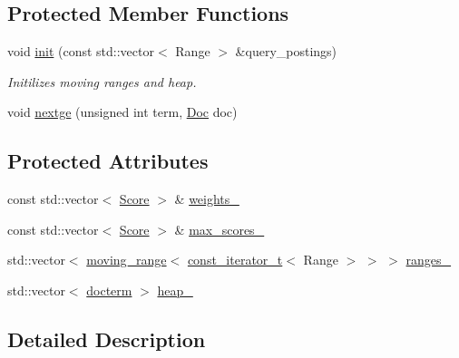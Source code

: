 \subsection*{Protected Member Functions}
\begin{DoxyCompactItemize}
\item 
void \mbox{\hyperlink{classirkit_1_1UnionRange_aabdf133213056f20e0526c6736dbff3e}{init}} (const std\+::vector$<$ Range $>$ \&query\+\_\+postings)
\begin{DoxyCompactList}\small\item\em Initilizes moving ranges and heap. \end{DoxyCompactList}\item 
void \mbox{\hyperlink{classirkit_1_1UnionRange_ab0548ed7d94aece8f72d0ca4db65b456}{nextge}} (unsigned int term, \mbox{\hyperlink{classirkit_1_1UnionRange_a387589b1f09868b60485c4ab8c61f97a}{Doc}} doc)
\end{DoxyCompactItemize}
\subsection*{Protected Attributes}
\begin{DoxyCompactItemize}
\item 
const std\+::vector$<$ \mbox{\hyperlink{classirkit_1_1UnionRange_a47fb098a85581f5e33f4203e16245dae}{Score}} $>$ \& \mbox{\hyperlink{classirkit_1_1UnionRange_a0c53eb9b1c9e8aa18621f4c129a6ff90}{weights\+\_\+}}
\item 
const std\+::vector$<$ \mbox{\hyperlink{classirkit_1_1UnionRange_a47fb098a85581f5e33f4203e16245dae}{Score}} $>$ \& \mbox{\hyperlink{classirkit_1_1UnionRange_a980f7cfaf14c7c4d93b13b6d7ce6a859}{max\+\_\+scores\+\_\+}}
\item 
std\+::vector$<$ \mbox{\hyperlink{structirkit_1_1moving__range}{moving\+\_\+range}}$<$ \mbox{\hyperlink{namespaceirkit_a4b1668583041117eb42c1b5a1091b804}{const\+\_\+iterator\+\_\+t}}$<$ Range $>$ $>$ $>$ \mbox{\hyperlink{classirkit_1_1UnionRange_acb9b9e969f1c90bb18bf1e4eb99f124b}{ranges\+\_\+}}
\item 
std\+::vector$<$ \mbox{\hyperlink{structirkit_1_1UnionRange_1_1docterm}{docterm}} $>$ \mbox{\hyperlink{classirkit_1_1UnionRange_a613eebb9b7b8601bffdad1d842c8c7f0}{heap\+\_\+}}
\end{DoxyCompactItemize}


\subsection{Detailed Description}
